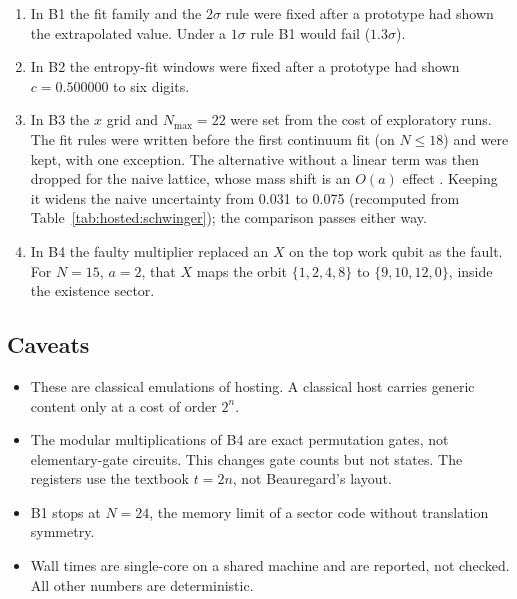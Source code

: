 \begin{enumerate}[nosep,label=(\roman*)]
\item In B1 the fit family and the $2\sigma$ rule were fixed after a prototype had shown the extrapolated value. Under a $1\sigma$ rule B1
would fail ($1.3\sigma$).
\item In B2 the entropy-fit windows were fixed after a prototype had shown $c=0.500000$ to six digits.
\item In B3 the $x$ grid and $N_{\max}=22$ were set from the cost of exploratory runs. The fit rules were written before the first
continuum fit (on $N\le18$) and were kept, with one exception. The alternative without a linear term was then dropped for the naive lattice,
whose mass shift is an $O(a)$ effect \cite{dempsey2022}. Keeping it widens the naive uncertainty from 0.031 to 0.075 (recomputed from
Table~\ref{tab:hosted:schwinger}); the comparison passes either way.
\item In B4 the faulty multiplier replaced an $X$ on the top work qubit as the fault. For $N=15$, $a=2$, that $X$ maps the orbit
$\{1,2,4,8\}$ to $\{9,10,12,0\}$, inside the existence sector.
\end{enumerate}

\subsection{Caveats}\label{app:hosted:caveats}

\begin{itemize}[nosep]
\item These are classical emulations of hosting. A classical host carries generic content only at a cost of order $2^n$.
\item The modular multiplications of B4 are exact permutation gates, not elementary-gate circuits. This changes gate counts but not
states. The registers use the textbook $t=2n$, not Beauregard's layout.
\item B1 stops at $N=24$, the memory limit of a sector code without translation symmetry.
\item Wall times are single-core on a shared machine and are reported, not checked. All other numbers are deterministic.
\end{itemize}
